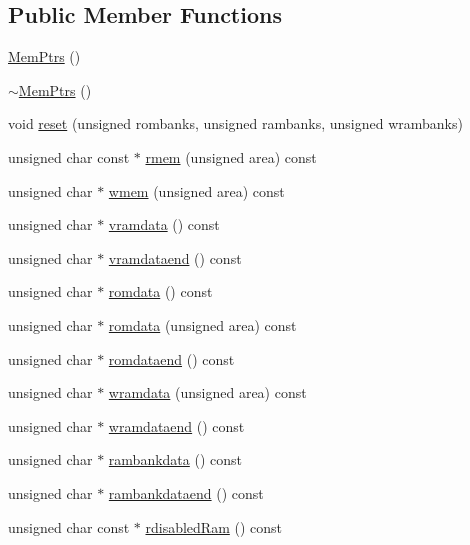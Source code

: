 \subsection*{Public Member Functions}
\begin{DoxyCompactItemize}
\item 
\hyperlink{classgambatte_1_1MemPtrs_ae35e38f60a85d83c90be24af72910488}{Mem\+Ptrs} ()
\item 
\hyperlink{classgambatte_1_1MemPtrs_a801a970e84764ae8cdf48d991ebabd5c}{$\sim$\+Mem\+Ptrs} ()
\item 
void \hyperlink{classgambatte_1_1MemPtrs_a615a22d074183acc99c99d7fe2761073}{reset} (unsigned rombanks, unsigned rambanks, unsigned wrambanks)
\item 
unsigned char const  $\ast$ \hyperlink{classgambatte_1_1MemPtrs_a72fd0391d940e7fc8ac733251b341b1f}{rmem} (unsigned area) const
\item 
unsigned char $\ast$ \hyperlink{classgambatte_1_1MemPtrs_a41d383f6db05d04edf7a32dd45ba3ace}{wmem} (unsigned area) const
\item 
unsigned char $\ast$ \hyperlink{classgambatte_1_1MemPtrs_ae8b8dc5b98600a3e73aa70cf0608ab77}{vramdata} () const
\item 
unsigned char $\ast$ \hyperlink{classgambatte_1_1MemPtrs_a20edfea173f8c47262730b3428d730bc}{vramdataend} () const
\item 
unsigned char $\ast$ \hyperlink{classgambatte_1_1MemPtrs_aabca959e142a0afa6dc51c57d181419f}{romdata} () const
\item 
unsigned char $\ast$ \hyperlink{classgambatte_1_1MemPtrs_ac76f370f6bc5a41410564f1975d94677}{romdata} (unsigned area) const
\item 
unsigned char $\ast$ \hyperlink{classgambatte_1_1MemPtrs_ad09b9a0330a3518a4e9c92a8aa8869af}{romdataend} () const
\item 
unsigned char $\ast$ \hyperlink{classgambatte_1_1MemPtrs_a0ec134dbb7787d80a2cae4d201833a6f}{wramdata} (unsigned area) const
\item 
unsigned char $\ast$ \hyperlink{classgambatte_1_1MemPtrs_a780233c9f5e89620540344db4b6a83e7}{wramdataend} () const
\item 
unsigned char $\ast$ \hyperlink{classgambatte_1_1MemPtrs_a8d64b50fee594657df07994866631cf9}{rambankdata} () const
\item 
unsigned char $\ast$ \hyperlink{classgambatte_1_1MemPtrs_af169f7b261149d6965f2bb6806919f0d}{rambankdataend} () const
\item 
unsigned char const  $\ast$ \hyperlink{classgambatte_1_1MemPtrs_a4d0df7283082af4c0acb7b4fb1ecbf61}{rdisabled\+Ram} () const

\end{DoxyCompactItemize}
